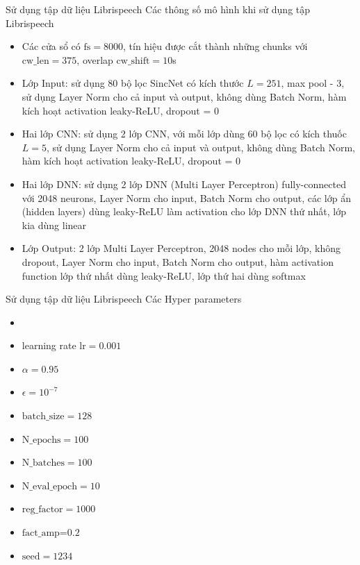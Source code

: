 \documentclass[notheorems, aspectratio=54]{beamer}
\begin{document}
\begin{frame}{Sử dụng tập dữ liệu Librispeech}
	Các thông số mô hình khi sử dụng tập Librispeech
	\begin{itemize}
		\item Các cửa sổ có $\text{fs} = 8000$, tín hiệu được cắt thành những chunks với $\text{cw\_len}=375$, overlap $\text{cw\_shift}=10$s
		\item Lớp Input: sử dụng 80 bộ lọc SincNet có kích thước $L=251$, max pool - 3, sử dụng Layer Norm cho cả input và output, không dùng Batch Norm, hàm kích hoạt activation leaky-ReLU, dropout = 0
		\item Hai lớp CNN: sử dụng 2 lớp CNN, với mỗi lớp dùng 60 bộ lọc có kích thuốc $L=5$, sử dụng Layer Norm cho cả input và output, không dùng Batch Norm, hàm kích hoạt activation leaky-ReLU, dropout = 0
		\item Hai lớp DNN: sử dụng 2 lớp DNN (Multi Layer Perceptron) fully-connected với 2048 neurons, Layer Norm cho input, Batch Norm cho output, các lớp ẩn (hidden layers) dùng leaky-ReLU làm activation cho lớp DNN thứ nhất, lớp kia dùng linear
		\item Lớp Output: 2 lớp Multi Layer Perceptron, 2048 nodes cho mỗi lớp, không dropout, Layer Norm cho input, Batch Norm cho output, hàm activation function lớp thứ nhất dùng leaky-ReLU, lớp thứ hai dùng softmax
	\end{itemize}
\end{frame}
\begin{frame}{Sử dụng tập dữ liệu Librispeech}
		Các Hyper parameters
		\begin{itemize}
			\item \item learning rate $\text{lr} = 0.001$
			\item $\alpha = 0.95$
			\item $\epsilon = 10^{-7}$
			\item $\text{batch\_size}=128$
			\item $\text{N\_epochs}=100$
			\item $\text{N\_batches}=100$
			\item $\text{N\_eval\_epoch}=10$
			\item $\text{reg\_factor}=1000$
			\item $\text{fact\_amp=0.2}$
			\item $\text{seed}=1234$
		\end{itemize}
\end{frame}
\end{document}
